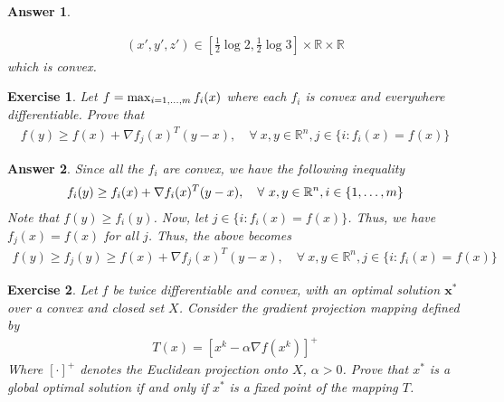 \documentclass[12pt]{article}
\theoremstyle{colon}
\newtheorem{exercise}{Exercise}
\newtheorem*{answer}{Answer}
\begin{document}
\begin{answer}
\begin{enumerate}[label=\arabic*)]
      \begin{gather*}
        (x',y',z') \in [\frac{1}{2}\log 2 , \frac{1}{2} \log 3] \times \mathbb{R} \times \mathbb{R}
      \end{gather*}
      which is convex.
  \end{enumerate}
\end{answer}

\clearpage

\begin{exercise}
  Let $f = \max_{i = 1, \mathellipsis, m} f_i(x)$ where each $f_i$ is convex and everywhere differentiable. Prove that
  \begin{gather*}
    f(y) \geq f(x) + \nabla f_j(x)^T (y-x), \quad \forall \ x,y \in \mathbb{R}^n, j \in \{i : f_i(x) = f(x) \}
  \end{gather*}
\end{exercise}

\begin{answer}
  Since all the $f_i$ are convex, we have the following inequality
  \begin{gather*}
    f_i(y) \geq f_i(x) + \nabla f_i(x)^T (y-x), \quad \forall \ x,y \in \mathbb{R}^n, i \in \{ 1, \mathellipsis, m \}
  \end{gather*}
  Note that $f(y) \geq f_i(y)$. Now, let $j \in \{i : f_i(x) = f(x) \}$. Thus, we have $f_j(x) = f(x)$ for all $j$. Thus, the above becomes
  \begin{gather*}
    f(y) \geq f_j(y) \geq f(x) + \nabla f_j(x)^T (y-x), \quad \forall \ x,y \in \mathbb{R}^n, j \in \{i : f_i(x) = f(x) \}
  \end{gather*}
\end{answer}

\clearpage

\begin{exercise}
  Let $f$ be twice differentiable and convex, with an optimal solution $\textbf{x}^*$ over a convex and closed set $X$. Consider the gradient projection mapping defined by
  \begin{gather*}
    T(x) = [x^k - \alpha \nabla f(x^k)]^+
  \end{gather*}
  Where $[\cdot]^+$ denotes the Euclidean projection onto $X$, $\alpha > 0$. Prove that $x^*$ is a global optimal solution if and only if $x^*$ is a fixed point of the mapping $T$.
\end{exercise}
\end{document}
